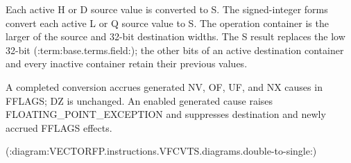 Each active H or D source value is converted to S. The signed-integer forms
convert each active L or Q source value to S. The operation container is the
larger of the source and 32-bit destination widths. The S result replaces the
low 32-bit (:term:base.terms.field:); the other bits of an active destination container and every
inactive container retain their previous values.

A completed conversion accrues generated NV, OF, UF, and NX causes in FFLAGS;
DZ is unchanged. An enabled generated cause raises FLOATING\_POINT\_EXCEPTION and
suppresses destination and newly accrued FFLAGS effects.

(:diagram:VECTORFP.instructions.VFCVTS.diagrams.double-to-single:)
